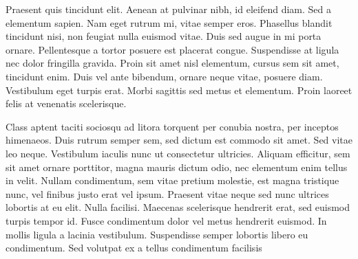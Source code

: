 Praesent quis tincidunt elit. Aenean at pulvinar nibh, id eleifend diam. Sed a elementum sapien. Nam eget rutrum mi, vitae semper eros. Phasellus blandit tincidunt nisi, non feugiat nulla euismod vitae. Duis sed augue in mi porta ornare. Pellentesque a tortor posuere est placerat congue. Suspendisse at ligula nec dolor fringilla gravida. Proin sit amet nisl elementum, cursus sem sit amet, tincidunt enim. Duis vel ante bibendum, ornare neque vitae, posuere diam. Vestibulum eget turpis erat. Morbi sagittis sed metus et elementum. Proin laoreet felis at venenatis scelerisque.

Class aptent taciti sociosqu ad litora torquent per conubia nostra, per inceptos himenaeos. Duis rutrum semper sem, sed dictum est commodo sit amet. Sed vitae leo neque. Vestibulum iaculis nunc ut consectetur ultricies. Aliquam efficitur, sem sit amet ornare porttitor, magna mauris dictum odio, nec elementum enim tellus in velit. Nullam condimentum, sem vitae pretium molestie, est magna tristique nunc, vel finibus justo erat vel ipsum. Praesent vitae neque sed nunc ultrices lobortis at eu elit. Nulla facilisi. Maecenas scelerisque hendrerit erat, sed euismod turpis tempor id. Fusce condimentum dolor vel metus hendrerit euismod. In mollis ligula a lacinia vestibulum. Suspendisse semper lobortis libero eu condimentum. Sed volutpat ex a tellus condimentum facilisis
